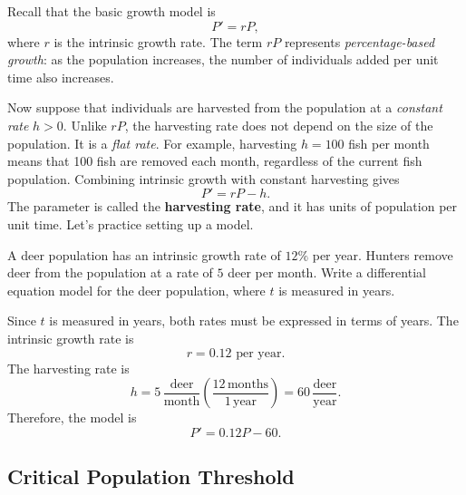 \documentclass[09pt,letterpaper]{article}
\begin{document}
Recall that the basic growth model is
\[
P'=rP,
\]
where $r$ is the intrinsic growth rate. The term $rP$ represents
\textit{percentage-based growth}: as the population increases, the number of
individuals added per unit time also increases.

Now suppose that individuals are harvested from the population at a \textit{constant
rate} $h>0$. Unlike $rP$, the harvesting rate does not depend on the size of
the population. It is a \textit{flat rate}. For example, harvesting
$h=100$ fish per month means that 100 fish are removed each month, regardless
of the current fish population. Combining intrinsic growth with constant harvesting gives
\[
P'=rP-h.
\]
The parameter is called the \textbf{harvesting rate}, and it has units of population per unit time. Let's practice setting up a model. 

\begin{example}[3]{
A deer population has an intrinsic growth rate of $12\%$ per year.
Hunters remove deer from the population at a rate of $5$ deer per month.
Write a differential equation model for the deer population, where $t$ is
measured in years.
}

Since $t$ is measured in years, both rates must be expressed in terms of
years. The intrinsic growth rate is
\[
r=0.12 \text{ per year}.
\]
The harvesting rate is
\[
h
=
5\,\frac{\text{deer}}{\text{month}}
\left(
\frac{12\,\text{months}}{1\,\text{year}}
\right)
=
60\,\frac{\text{deer}}{\text{year}}.
\]
Therefore, the model is
\[
\boxed{
P'=0.12P-60.
}
\]
\end{example}

\subsection{Critical Population Threshold}
\end{document}
